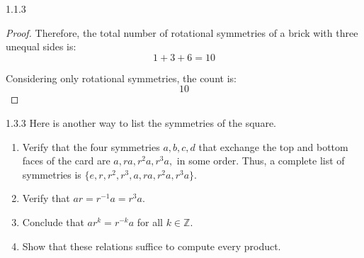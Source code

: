 \documentclass[12pt]{amsart}
\theoremstyle{definition}
\numberwithin{equation}{section}
\newcommand{\Z}{\mathbb{Z}}
\begin{document}
\begin{exercise}{1.1.3}
\begin{proof}
    \noindent Therefore, the total number of rotational symmetries of a brick with three unequal sides is:
    \begin{equation*}
    1 + 3 + 6 = 10
    \end{equation*}

    \noindent Considering only rotational symmetries, the count is:
    \begin{equation*}
    \boxed{10}
    \end{equation*}
    \end{proof}
    \end{exercise}

    
\newpage
\begin{exercise}{1.3.3} Here is another way to list the symmetries of the square. 
\begin{enumerate}[label=\alph*.]
            \item Verify that the four symmetries \(a,b,c,d\) that exchange the top and bottom faces of the card are \(a, ra, r^2a, r^3a,\) in some order. Thus, a complete list of symmetries is \(\{e, r, r^2, r^3, a, ra, r^2a, r^3a\}\).

            \item Verify that \(ar=r^{-1}a=r^3a\).

            \item Conclude that \(ar^k=r^{-k}a\) for all \(k\in \Z\).

            \item Show that these relations suffice to compute every product.
        \end{enumerate}
        

\end{exercise}
\end{document}
